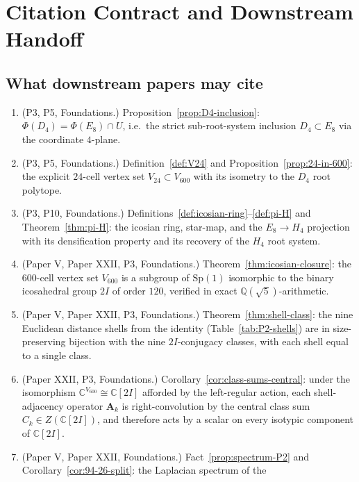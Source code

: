 \documentclass[11pt, a4paper]{amsart}
\theoremstyle{definition}
\newcommand{\Q}{\mathbb{Q}}
\newcommand{\C}{\mathbb{C}}
\begin{document}
\section{Citation Contract and Downstream Handoff}
\label{sec:handoff}

\subsection{What downstream papers may cite}

\begin{enumerate}
\item (P3, P5, Foundations.)
  Proposition~\ref{prop:D4-inclusion}: $\Phi(D_4) = \Phi(E_8)
  \cap U$, i.e.\ the strict sub-root-system inclusion $D_4 \subset
  E_8$ via the coordinate $4$-plane.
\item (P3, P5, Foundations.) Definition~\ref{def:V24} and
  Proposition~\ref{prop:24-in-600}: the explicit $24$-cell vertex
  set $V_{24} \subset V_{600}$ with its isometry to the $D_4$ root
  polytope.
\item (P3, P10, Foundations.)
  Definitions~\ref{def:icosian-ring}--\ref{def:pi-H} and
  Theorem~\ref{thm:pi-H}: the icosian ring, star-map, and the
  $E_8 \to H_4$ projection with its densification property and its
  recovery of the $H_4$ root system.
\item (Paper V, Paper XXII, P3, Foundations.)
  Theorem~\ref{thm:icosian-closure}: the $600$-cell vertex set
  $V_{600}$ is a subgroup of $\mathrm{Sp}(1)$ isomorphic to the
  binary icosahedral group $2I$ of order $120$, verified in
  exact $\Q(\sqrt 5)$-arithmetic.
\item (Paper V, Paper XXII, P3, Foundations.)
  Theorem~\ref{thm:shell-class}: the nine Euclidean distance
  shells from the identity (Table~\ref{tab:P2-shells}) are in
  size-preserving bijection with the nine $2I$-conjugacy classes,
  with each shell equal to a single class.
\item (Paper XXII, P3, Foundations.)
  Corollary~\ref{cor:class-sums-central}: under the isomorphism
  $\C^{V_{600}} \cong \C[2I]$ afforded by the left-regular
  action, each shell-adjacency operator $\mathbf{A}_k$ is
  right-convolution by the central class sum $C_k \in Z(\C[2I])$,
  and therefore acts by a scalar on every isotypic component of
  $\C[2I]$.
\item (Paper V, Paper XXII, Foundations.)
  Fact~\ref{prop:spectrum-P2} and
  Corollary~\ref{cor:94-26-split}: the Laplacian spectrum of the

\end{enumerate}
\end{document}
